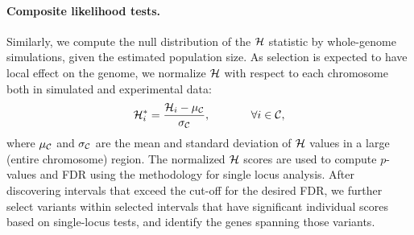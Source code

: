 \paragraph{Composite likelihood tests.}
Similarly, we compute the null distribution of the ${\cal H}$ statistic by 
whole-genome simulations, given the estimated population size.
As selection is expected to have local effect on the genome, we
normalize ${\cal H}$ with respect to each chromosome both in simulated and
experimental data:
\begin{equation} {\cal H}_i^*=\frac{{\cal H}_i-\mu_{\cal C}}{\sigma_{\cal C}},
\hspace{0.5in} \forall i \in {\cal C},
\end{equation} 
where $\mu_{\cal C}$ and $\sigma_{\cal C}$ are the mean and standard deviation
of ${\cal H}$ values in a large (entire chromosome) region. The normalized
${\cal H}$ scores are used to compute $p$-values and FDR using the
methodology for single locus analysis. After discovering intervals
that exceed the cut-off for the desired FDR, we further select
variants within selected intervals that have significant individual
scores based on single-locus tests, and identify the genes spanning
those variants.


